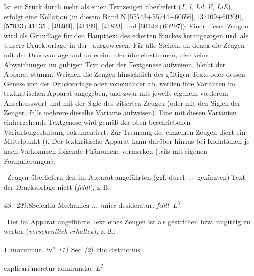 
\noindent Ist ein Stück durch mehr als einen Textzeugen überliefert (\textit{L}, \textit{l}, \textit{Lil}, \textit{E}, \textit{LiE}), erfolgt eine Kollation 
(in diesem Band 
N.\;\ref{55743+55744+60656}, \ref{37109+60209}, \ref{57033+41135}, \ref{49409}, \ref{41199}, \ref{41823} und \ref{60142+60297}): 
Einer dieser Zeugen wird als Grundlage für den Haupttext des edierten Stückes herangezogen und als \glqq Unsere Druckvorlage\grqq\ in der  \grqq\ ausgewiesen. Für alle Stellen, an denen die Zeugen mit der Druckvorlage und untereinander übereinstimmen, also keine Abweichungen im gültigen Text oder der Textgenese aufweisen, bleibt der Apparat stumm. 
Weichen die Zeugen hinsichtlich des gültigen Texts oder dessen Genese von der Druckvorlage oder voneinander ab, werden ihre Varianten im textkritischen Apparat angegeben, und zwar mit jeweils eigenem vorderem Anschlusswort und mit der Sigle des zitierten Zeugen (oder mit den Siglen der Zeugen, falls mehrere dieselbe Variante aufweisen).
Eine mit diesen Varianten einhergehende Textgenese wird gemäß der oben beschriebenen Variantengestaltung dokumentiert. 
Zur Trennung der einzelnen Zeugen dient ein Mittelpunkt (\!\textbullet\!).
Der textkritische Apparat kann darüber hinaus bei Kollationen je nach Vorkommen folgende Phänomene vermerken (teils mit eigenen Formulierungen):
\par
\medskip

\noindent\textemdash\ Zeugen überliefern den im Apparat angeführten (ggf. durch \lbrack...\rbrack\ gekürzten) Text der Druckvorlage nicht (\textit{fehlt}), z.\,B.:\par %
{\footnotesize%
4\textendash S.~239.8\hspace{5mm}Scientia Mechanica \lbrack...\rbrack\ unice desideratur. \textit{fehlt~L\textsuperscript{3}}
}%
\par
\medskip

\noindent\textemdash\ Der im Apparat angeführte Text eines Zeugen ist als gestrichen bzw. ungültig zu werten (\textit{versehentlich erhalten}), z.\,B.:
\par\vspace{0.5ex} %

{\footnotesize%
11\hspace{5mm}monuimus. \lbrack2v\textsuperscript{o}\rbrack\
\textit{(1)}~Sed
\textit{(2)}~Hic
distinctius
\par\vspace{-0.67ex} 

explicari meretur
admirandae~\textit{L\textsuperscript{1}}
}%
\par
\medskip

